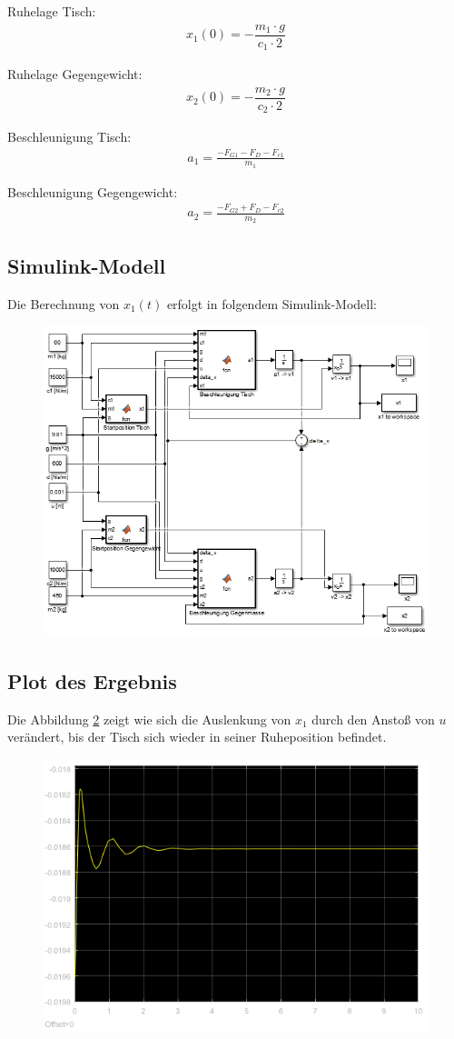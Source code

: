 \documentclass[]{scrartcl}
\begin{document}
Ruhelage Tisch:
\begin{align}
x_{1}(0) = - \dfrac{m_{1} \cdot g}{c_{1} \cdot 2}
\end{align}

Ruhelage Gegengewicht:
\begin{align}
x_{2}(0) = - \dfrac{m_{2} \cdot g}{c_{2} \cdot 2}
\end{align}

Beschleunigung Tisch:
\begin{align}
a_{1} = \frac{-F_{G1} - F_{D} - F_{c1}}{m_{1}}
\end{align}

Beschleunigung Gegengewicht:
\begin{align}
a_{2} = \frac{-F_{G2} + F_{D} - F_{c2}}{m_{2}}
\end{align}

\subsection{Simulink-Modell}
Die Berechnung von $x_{1}(t)$ erfolgt in folgendem Simulink-Modell:

\begin{figure}[H]
\centering
\includegraphics[width=1\linewidth]{./4_Modell}
\caption{}
\label{fig:4_Modell}
\end{figure}

\subsection{Plot des Ergebnis}
Die Abbildung \ref{fig:4_Plot} zeigt wie sich die Auslenkung von $x_{1}$ durch den Anstoß von $u$ verändert, bis der Tisch sich wieder in seiner Ruheposition befindet.

\begin{figure}[H]
\centering
\includegraphics[width=0.5\linewidth]{./4_Plot}
\caption{}
\label{fig:4_Plot}
\end{figure}
\end{document}
